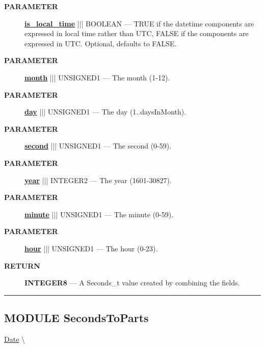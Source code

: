 \par
\begin{description}
\item [\colorbox{tagtype}{\color{white} \textbf{\textsf{PARAMETER}}}] \textbf{\underline{is\_local\_time}} ||| BOOLEAN --- TRUE if the datetime components are expressed in local time rather than UTC, FALSE if the components are expressed in UTC. Optional, defaults to FALSE.
\item [\colorbox{tagtype}{\color{white} \textbf{\textsf{PARAMETER}}}] \textbf{\underline{month}} ||| UNSIGNED1 --- The month (1-12).
\item [\colorbox{tagtype}{\color{white} \textbf{\textsf{PARAMETER}}}] \textbf{\underline{day}} ||| UNSIGNED1 --- The day (1..daysInMonth).
\item [\colorbox{tagtype}{\color{white} \textbf{\textsf{PARAMETER}}}] \textbf{\underline{second}} ||| UNSIGNED1 --- The second (0-59).
\item [\colorbox{tagtype}{\color{white} \textbf{\textsf{PARAMETER}}}] \textbf{\underline{year}} ||| INTEGER2 --- The year (1601-30827).
\item [\colorbox{tagtype}{\color{white} \textbf{\textsf{PARAMETER}}}] \textbf{\underline{minute}} ||| UNSIGNED1 --- The minute (0-59).
\item [\colorbox{tagtype}{\color{white} \textbf{\textsf{PARAMETER}}}] \textbf{\underline{hour}} ||| UNSIGNED1 --- The hour (0-23).
\end{description}







\par
\begin{description}
\item [\colorbox{tagtype}{\color{white} \textbf{\textsf{RETURN}}}] \textbf{INTEGER8} --- A Seconds\_t value created by combining the fields.
\end{description}




\rule{\linewidth}{0.5pt}
\subsection*{\textsf{\colorbox{headtoc}{\color{white} MODULE}
SecondsToParts}}

\hypertarget{ecldoc:date.secondstoparts}{}
\hspace{0pt} \hyperlink{ecldoc:Date}{Date} \textbackslash 

